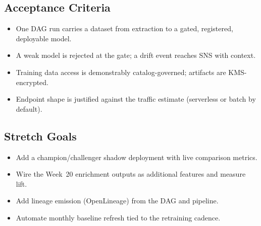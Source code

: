 \subsection*{Acceptance Criteria}
\begin{itemize}
    \item One DAG run carries a dataset from extraction to a gated, registered, deployable model.
    \item A weak model is rejected at the gate; a drift event reaches SNS with context.
    \item Training data access is demonstrably catalog-governed; artifacts are KMS-encrypted.
    \item Endpoint shape is justified against the traffic estimate (serverless or batch by default).
\end{itemize}

\subsection*{Stretch Goals}
\begin{itemize}
    \item Add a champion/challenger shadow deployment with live comparison metrics.
    \item Wire the Week~20 enrichment outputs as additional features and measure lift.
    \item Add lineage emission (OpenLineage) from the DAG and pipeline.
    \item Automate monthly baseline refresh tied to the retraining cadence.
\end{itemize}
